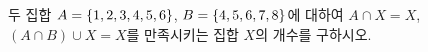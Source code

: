 두 집합 $A=\{1{,}\mkern3mu\mathopen{}2{,}\mkern3mu\mathopen{}3{,}\mkern3mu\mathopen{}4{,}\mkern3mu\mathopen{}5{,}\mkern3mu\mathopen{}6\}$, $B=\{4{,}\mkern3mu\mathopen{}5{,}\mkern3mu\mathopen{}6{,}\mkern3mu\mathopen{}7{,}\mkern3mu\mathopen{}8\}$에 대하여 $A\cap X=X$, $(A\cap B)\cup X=X$를 만족시키는 집합 $X$의 개수를 구하시오.
